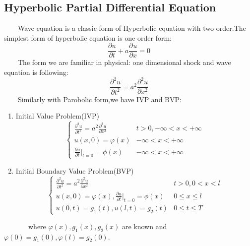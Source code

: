 \documentclass[a4paper]{article}
\newenvironment{enumeratenumeric}{\begin{enumerate}[1.] }{\end{enumerate}}
\begin{document}
\subsection{Hyperbolic Partial Differential Equation}

\ \ \ \ Wave equation is a classic form of Hyperbolic equation with two
order.The simplest form of hyperbolic equation is one order form:
\begin{equation}
  \frac{\partial u}{\partial t} + a \frac{\partial^{} u}{\partial x} = 0
\end{equation}
\ \ \ \ The form we are familiar in physical: one dimensional shock and wave
equation is following:
\begin{equation}
  \frac{\partial^2 u}{\partial t^2} = a^2 \frac{\partial^2 u}{\partial x^2}
\end{equation}
\ \ \ \ Similarly with Parobolic form,we have IVP and BVP:
\begin{enumeratenumeric}
  \item Initial Value Problem(IVP)
  \begin{equation}
    \left\{ \begin{array}{ll}
      \frac{\partial^2 u}{\partial t^2} = a^2 \frac{\partial^2 u}{\partial
      x^2} & t > 0, - \infty < x < + \infty\\
      u \left( x, 0 \right) = \varphi \left( x \right) & - \infty < x < +
      \infty\\
      \frac{\partial u}{\partial t} |_{t = 0} = \phi \left( x \right) & -
      \infty < x < + \infty
    \end{array} \right.
  \end{equation}
  \item Initial Boundary Value Problem(BVP)
  \begin{equation}
    \left\{ \begin{array}{ll}
      \frac{\partial^2 u}{\partial t^2} = a^2 \frac{\partial^2 u}{\partial
      x^2} & t > 0, 0 < x < l\\
      u \left( x, 0 \right) = \varphi \left( x \right), \frac{\partial
      u}{\partial t} |_{t = 0} = \phi \left( x \right) & 0 \leqslant x
      \leqslant l\\
      u \left( 0, t \right) = g_1 \left( t \right), u \left( l, t \right) =
      g_2 \left( t \right) & 0 \leqslant t \leqslant T
    \end{array} \right.
  \end{equation}
\end{enumeratenumeric}
\ \ \ \ \ \ \ where $\varphi \left( x \right), g_1 \left( x \right), g_2
\left( x \right)$ are known and $\varphi \left( 0 \right) = g_1 \left( 0
\right), \varphi \left( l \right) = g_2 \left( 0 \right)$.
\end{document}
